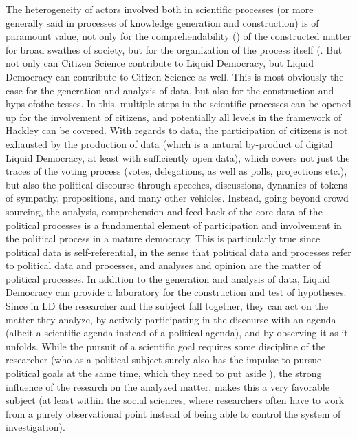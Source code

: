 The heterogeneity of actors involved both in scientific processes (or more generally said in processes of knowledge generation and construction) is of paramount value, not only for the comprehendability () of the constructed matter for broad swathes of society, but for the organization of the process itself (. But not only can Citizen Science contribute to Liquid Democracy, but Liquid Democracy can contribute to Citizen Science as well. This is most obviously the case for the generation and analysis of data, but also for the construction and  hyps ofothe
tesses. In this, multiple steps in the scientific processes can be opened up for the involvement of citizens, and potentially all levels in the framework of Hackley can be covered.
With regards to data, the participation of citizens is not exhausted by the production of data (which is a natural by-product of digital Liquid Democracy, at least with sufficiently open data), which covers not just the traces of the voting process (votes, delegations, as well as polls, projections etc.), but also the political discourse through speeches, discussions, dynamics of tokens of sympathy, propositions, and many other vehicles. Instead, going beyond crowd sourcing, the analysis, comprehension and feed back of the core data of the political processes is a fundamental element of participation and involvement in the political process in a mature democracy. This is particularly true since political data is self-referential, in the sense that political data and processes refer to political data and processes, and analyses and opinion are the matter of political processes. 
In addition to the generation and analysis of data, Liquid Democracy can provide a laboratory for the construction and test of hypotheses. Since in LD the researcher and the subject fall together, they can act on the matter they analyze, by actively participating in the discourse with an agenda (albeit a scientific agenda instead of a political agenda), and by observing it as it unfolds. While the pursuit of a scientific goal requires some discipline of the researcher (who as a political subject surely also has the impulse to pursue political goals at the same time, which they need to put aside ), the strong influence of the research on the analyzed matter, makes this a very favorable subject (at least within the social sciences, where researchers often have to work from a purely observational point instead of being able to control the system of investigation). 
